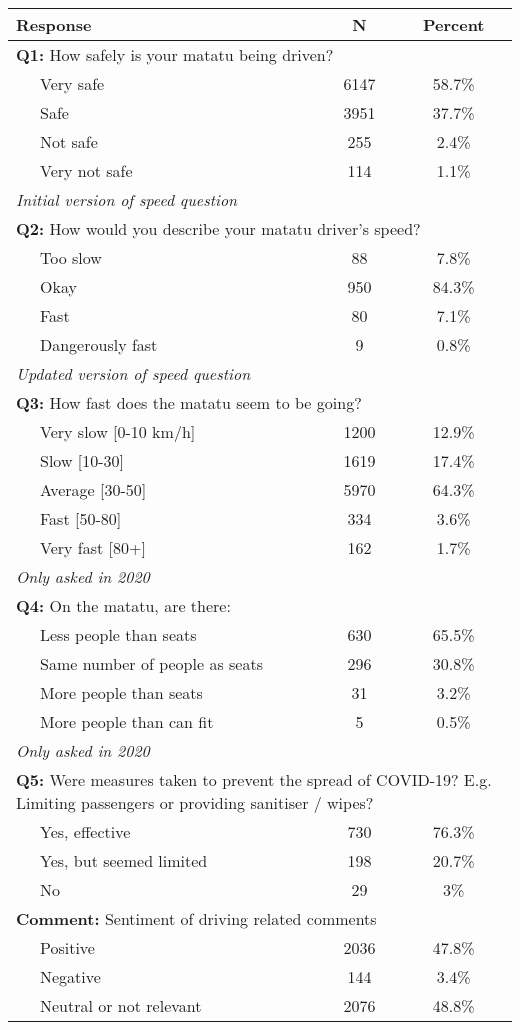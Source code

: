 \begin{tabular}{lcc} 
\hline 
Response & N & Percent \\ 
\hline 
\multicolumn{3}{l}{\textbf{Q1:} How safely is your matatu being driven?} \\ 
~~~Very safe & 6147 & 58.7\% \\ 
 ~~~Safe & 3951 & 37.7\% \\ 
 ~~~Not safe & 255 & 2.4\% \\ 
 ~~~Very not safe & 114 & 1.1\% \\ 
\hline 
\multicolumn{3}{l}{\textit{Initial version of speed question}} \\ 
\multicolumn{3}{l}{\textbf{Q2:} How would you describe your matatu driver's speed?} \\ 
~~~Too slow & 88 & 7.8\% \\ 
 ~~~Okay & 950 & 84.3\% \\ 
 ~~~Fast & 80 & 7.1\% \\ 
 ~~~Dangerously fast & 9 & 0.8\% \\ 
\hline 
\multicolumn{3}{l}{\textit{Updated version of speed question}} \\ 
\multicolumn{3}{l}{\textbf{Q3:} How fast does the matatu seem to be going?} \\ 
~~~Very slow [0-10 km/h] & 1200 & 12.9\% \\ 
 ~~~Slow [10-30] & 1619 & 17.4\% \\ 
 ~~~Average [30-50] & 5970 & 64.3\% \\ 
 ~~~Fast [50-80] & 334 & 3.6\% \\ 
 ~~~Very fast [80+] & 162 & 1.7\% \\ 
\hline 
\multicolumn{3}{l}{\textit{Only asked in 2020}} \\ 
\multicolumn{3}{l}{\textbf{Q4:} On the matatu, are there:} \\ 
~~~Less people than seats & 630 & 65.5\% \\ 
 ~~~Same number of people as seats & 296 & 30.8\% \\ 
 ~~~More people than seats & 31 & 3.2\% \\ 
 ~~~More people than can fit & 5 & 0.5\% \\ 
\hline 
\multicolumn{3}{l}{\textit{Only asked in 2020}} \\ 
\multicolumn{3}{p{8cm}}{\textbf{Q5:} Were measures taken to prevent the spread of COVID-19? E.g. Limiting passengers or providing sanitiser / wipes?} \\ 
~~~Yes, effective & 730 & 76.3\% \\ 
 ~~~Yes, but seemed limited & 198 & 20.7\% \\ 
 ~~~No & 29 & 3\% \\ 
\hline 
\multicolumn{3}{p{8cm}}{\textbf{Comment:} Sentiment of driving related comments} \\ 
~~~Positive & 2036 & 47.8\% \\ 
 ~~~Negative & 144 & 3.4\% \\ 
 ~~~Neutral or not relevant & 2076 & 48.8\% \\ 
\hline 
\end{tabular}